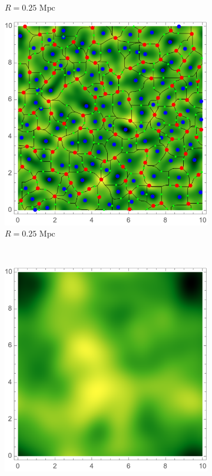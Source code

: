 \documentclass[a4paper, 11pt]{article}
\begin{document}
\begin{figure}
\begin{subfigure}[b]{0.3\textwidth}
\caption{$R=0.25\text{ Mpc}$}
\label{fig:}
\end{subfigure}
\begin{subfigure}[b]{0.3\textwidth}
\includegraphics[width=\textwidth]{ScaleR=025_delta}
\caption{$R=0.25\text{ Mpc}$}
\label{fig:}
\end{subfigure}\\
\begin{subfigure}[b]{0.3\textwidth}
\includegraphics[width=\textwidth]{ScaleR=050_Psi}

\end{subfigure}
\end{figure}
\end{document}
